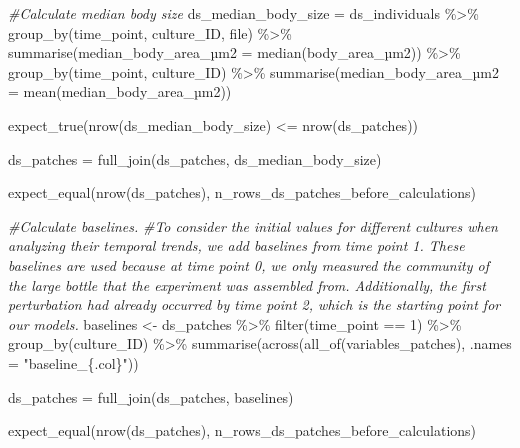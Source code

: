 \documentclass[
]{article}
\newenvironment{Shaded}{\begin{snugshade}}{\end{snugshade}}
\newcommand{\AttributeTok}[1]{\textcolor[rgb]{0.77,0.63,0.00}{#1}}
\newcommand{\CommentTok}[1]{\textcolor[rgb]{0.56,0.35,0.01}{\textit{#1}}}
\newcommand{\DecValTok}[1]{\textcolor[rgb]{0.00,0.00,0.81}{#1}}
\newcommand{\FunctionTok}[1]{\textcolor[rgb]{0.00,0.00,0.00}{#1}}
\newcommand{\NormalTok}[1]{#1}
\newcommand{\OtherTok}[1]{\textcolor[rgb]{0.56,0.35,0.01}{#1}}
\newcommand{\SpecialCharTok}[1]{\textcolor[rgb]{0.00,0.00,0.00}{#1}}
\newcommand{\StringTok}[1]{\textcolor[rgb]{0.31,0.60,0.02}{#1}}
\begin{document}
\begin{Shaded}
\begin{Highlighting}[]
\CommentTok{\#Calculate median body size}
\NormalTok{ds\_median\_body\_size }\OtherTok{=}\NormalTok{ ds\_individuals }\SpecialCharTok{\%\textgreater{}\%}
  \FunctionTok{group\_by}\NormalTok{(time\_point,}
\NormalTok{           culture\_ID,}
\NormalTok{           file) }\SpecialCharTok{\%\textgreater{}\%}
  \FunctionTok{summarise}\NormalTok{(median\_body\_area\_µ}\AttributeTok{m2 =} \FunctionTok{median}\NormalTok{(body\_area\_µm2)) }\SpecialCharTok{\%\textgreater{}\%}
  \FunctionTok{group\_by}\NormalTok{(time\_point,}
\NormalTok{           culture\_ID) }\SpecialCharTok{\%\textgreater{}\%}
  \FunctionTok{summarise}\NormalTok{(median\_body\_area\_µ}\AttributeTok{m2 =} \FunctionTok{mean}\NormalTok{(median\_body\_area\_µm2))}

\FunctionTok{expect\_true}\NormalTok{(}\FunctionTok{nrow}\NormalTok{(ds\_median\_body\_size) }\SpecialCharTok{\textless{}=} \FunctionTok{nrow}\NormalTok{(ds\_patches))}

\NormalTok{ds\_patches }\OtherTok{=} \FunctionTok{full\_join}\NormalTok{(ds\_patches, ds\_median\_body\_size)}

\FunctionTok{expect\_equal}\NormalTok{(}\FunctionTok{nrow}\NormalTok{(ds\_patches),}
\NormalTok{             n\_rows\_ds\_patches\_before\_calculations)}
\end{Highlighting}
\end{Shaded}

\begin{Shaded}
\begin{Highlighting}[]
\CommentTok{\#Calculate baselines. }
\CommentTok{\#To consider the initial values for different cultures when analyzing their temporal trends, we add baselines from time point 1. These baselines are used because at time point 0, we only measured the community of the large bottle that the experiment was assembled from. Additionally, the first perturbation had already occurred by time point 2, which is the starting point for our models.}
\NormalTok{baselines }\OtherTok{\textless{}{-}}\NormalTok{ ds\_patches }\SpecialCharTok{\%\textgreater{}\%}
  \FunctionTok{filter}\NormalTok{(time\_point }\SpecialCharTok{==} \DecValTok{1}\NormalTok{) }\SpecialCharTok{\%\textgreater{}\%}
  \FunctionTok{group\_by}\NormalTok{(culture\_ID) }\SpecialCharTok{\%\textgreater{}\%}
  \FunctionTok{summarise}\NormalTok{(}\FunctionTok{across}\NormalTok{(}\FunctionTok{all\_of}\NormalTok{(variables\_patches), }
                   \AttributeTok{.names =} \StringTok{"baseline\_\{.col\}"}\NormalTok{))}

\NormalTok{ds\_patches }\OtherTok{=} \FunctionTok{full\_join}\NormalTok{(ds\_patches, baselines)}

\FunctionTok{expect\_equal}\NormalTok{(}\FunctionTok{nrow}\NormalTok{(ds\_patches),}
\NormalTok{             n\_rows\_ds\_patches\_before\_calculations)}
\end{Highlighting}
\end{Shaded}
\end{document}
